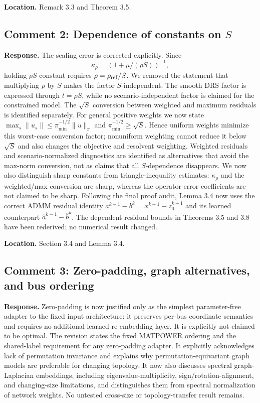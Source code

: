 \documentclass[11pt]{article}
\begin{document}
\textbf{Location.} Remark 3.3 and Theorem 3.5.

\subsection*{Comment 2: Dependence of constants on $S$}
\textbf{Response.} The scaling error is corrected explicitly. Since
\[
\kappa_\rho=(1+\mu/(\rho S))^{-1},
\]
holding $\rho S$ constant requires $\rho=\rho_{\rm ref}/S$. We removed the statement that multiplying $\rho$ by $S$ makes the factor $S$-independent. The smooth DRS factor is expressed through $t=\rho S$, while no scenario-independent factor is claimed for the constrained model. The $\sqrt S$ conversion between weighted and maximum residuals is identified separately. For general positive weights we now state $\max_s\|u_s\|\le\pi_{\min}^{-1/2}\|u\|_\pi$ and $\pi_{\min}^{-1/2}\ge\sqrt S$. Hence uniform weights minimize this worst-case conversion factor; nonuniform weighting cannot reduce it below $\sqrt S$ and also changes the objective and resolvent weighting. Weighted residuals and scenario-normalized diagnostics are identified as alternatives that avoid the max-norm conversion, not as claims that all $S$-dependence disappears. We now also distinguish sharp constants from triangle-inequality estimates: $\kappa_\rho$ and the weighted/max conversion are sharp, whereas the operator-error coefficients are not claimed to be sharp. Following the final proof audit, Lemma 3.4 now uses the correct ADMM residual identity $a^{k-1}-b^k=x^{k+1}-z_0^{k+1}$ and its learned counterpart $\widehat a^{k-1}-\widehat b^k$. The dependent residual bounds in Theorems 3.5 and 3.8 have been rederived; no numerical result changed.

\textbf{Location.} Section 3.4 and Lemma 3.4.

\subsection*{Comment 3: Zero-padding, graph alternatives, and bus ordering}
\textbf{Response.} Zero-padding is now justified only as the simplest parameter-free adapter to the fixed input architecture: it preserves per-bus coordinate semantics and requires no additional learned re-embedding layer. It is explicitly not claimed to be optimal. The revision states the fixed MATPOWER ordering and the shared-label requirement for any zero-padding adapter. It explicitly acknowledges lack of permutation invariance and explains why permutation-equivariant graph models are preferable for changing topology. It now also discusses spectral graph-Laplacian embeddings, including eigenvalue-multiplicity, sign/rotation-alignment, and changing-size limitations, and distinguishes them from spectral normalization of network weights. No untested cross-size or topology-transfer result remains.
\end{document}
